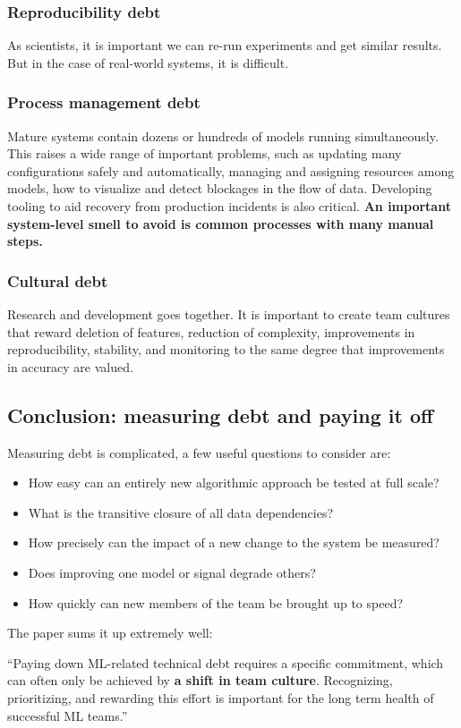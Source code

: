 \documentclass[../main.tex]{subfiles}
\begin{document}
\subsubsection{Reproducibility debt}
As scientists, it is important we can re-run experiments and get similar results. But in the case
of real-world systems, it is difficult.

\subsubsection{Process management debt}
Mature systems contain dozens or hundreds of models running simultaneously. This raises a wide range
of important problems, such as updating many configurations safely and automatically, managing and assigning
resources among models, how to visualize and detect blockages in the flow of data. Developing tooling
to aid recovery from production incidents is also critical. \textbf{An important system-level smell
to avoid is common processes with many manual steps.}

\subsubsection{Cultural debt}
Research and development goes together. It is important to create team cultures that reward deletion
of features, reduction of complexity, improvements in reproducibility, stability, and monitoring to the
same degree that improvements in accuracy are valued.

\subsection{Conclusion: measuring debt and paying it off}
Measuring debt is complicated, a few useful questions to consider are:
\begin{itemize}
    \item How easy can an entirely new algorithmic approach be tested at full scale?
    \item What is the transitive closure of all data dependencies?
    \item How precisely can the impact of a new change to the system be measured?
    \item Does improving one model or signal degrade others?
    \item How quickly can new members of the team be brought up to speed?
\end{itemize}


The paper sums it up extremely well:
\begin{displayquote}
    \enquote{Paying down ML-related technical debt requires a specific commitment, which can often only
        be achieved by \textbf{a shift in team culture}. Recognizing, prioritizing, and rewarding this
        effort is important for the long term health of successful ML teams.}
\end{displayquote}
\end{document}
